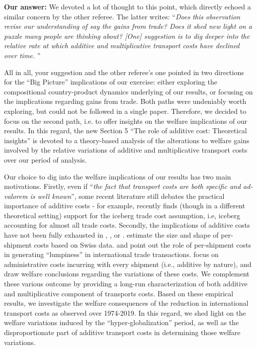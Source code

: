 \documentclass[a4paper,11pt]{article}
\begin{document}
\textbf{Our answer:} We devoted a lot of thought to this point, which directly echoed a similar concern by the other referee. The latter writes: ``\emph{Does this observation revise our understanding of say the gains from trade? Does it shed new light on a puzzle many people are thinking about? [One] suggestion is to dig deeper into the relative rate at which additive and multiplicative transport costs have declined over time.}
''

All in all, your suggestion and the other referee's one pointed in two directions for the ``Big Picture'' implications of our exercise: either exploring the compositional country-product dynamics underlying of our results, or focusing on the implications regarding gains from trade. Both paths were undeniably worth exploring, but could not be followed in a single paper. Therefore, we decided to focus on the second path, i.e. to  offer insights on the welfare implications of our results. In this regard, the new Section 5 ``The role of additive cost: Theoretical insights'' is devoted to a theory-based analysis of the alterations to welfare gains involved by the relative variations of additive and multiplicative transport costs over our period of analysis.

Our choice to dig into the welfare implications of our results has two main motivations. Firstly, even if ``\emph{the fact that transport costs are both specific and ad-valorem is well known}'', some recent literature still debates the practical importance of additive costs - for example, \cite{Lashkaripour_JIE2020} recently finds (though in a different theoretical setting) support for the iceberg trade cost assumption, i.e, iceberg accounting for almost all trade costs. Secondly, the implications of additive costs have not been fully exhausted in \citet{Irrazabal_2015}, \cite{Hornok-et-al-RES-2015, Hornok-et-al-JIE-2015}, \cite{Alessandria-et-al-AER-2010} or \citet{sorensen2014}. \cite{Kropf-Saure-JIE-2016} estimate the size and shape of per-shipment costs based on Swiss data. \cite{Alessandria-et-al-AER-2010} and \cite{Hornok-et-al-RES-2015} point out the role of per-shipment costs in generating ``lumpiness'' in international trade transactions. \cite{Hornok-et-al-JIE-2015} focus on administrative costs incurring with every shipment (i.e., additive by nature), and draw welfare conclusions regarding the variations of these costs. We complement these various outcome by providing a long-run characterization of both additive and multiplicative component of transports costs. Based on these empirical results, we investigate the welfare consequences of the reduction in international transport costs as observed over 1974-2019. In this regard, we shed light on the welfare variations induced by the ``hyper-globalization'' period, as well as the disproportionate part of additive transport costs in determining those welfare variations.\smallskip
\end{document}
